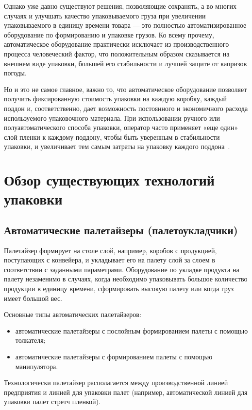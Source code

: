 Однако уже давно существуют решения, позволяющие сохранять, а во многих случаях и улучшать качество упаковываемого груза при увеличении упаковываемого в единицу времени товара --- это полностью автоматизированное оборудование по формированию и упаковке грузов. Ко всему прочему, автоматическое оборудование практически исключает из производственного процесса человеческий фактор, что положительным образом сказывается на внешнем виде упаковки, большей его стабильности и лучшей защите от капризов погоды. 

Но и это не самое главное, важно то, что автоматическое оборудование позволяет получить фиксированную стоимость упаковки на каждую коробку, каждый поддон и, соответственно, дает возможность постоянного и экономичного расхода используемого упаковочного материала. При использовании ручного или полуавтоматического способа упаковки, оператор часто применяет «еще один» слой пленки к каждому поддону, чтобы быть уверенным в стабильности упаковки, и увеличивает тем самым затраты на упаковку каждого поддона~\cite{stroi:upakovka}.

\section{Обзор существующих технологий упаковки}

\subsection*{Автоматические палетайзеры (палетоукладчики)}
Палетайзер формирует на столе слой, например, коробов с продукцией, поступающих с конвейера, и укладывает его на палету слой за слоем в соответствии с заданными параметрами. Оборудование по укладке продукта на палету незаменимо в случаях, когда необходимо упаковывать большое количество продукции в единицу времени, сформировать высокую палету или когда груз имеет большой вес.

Основные типы автоматических палетайзеров:

\begin{itemize}
    \item автоматические палетайзеры с послойным формированием палеты с помощью толкателя; 
    \item автоматические палетайзеры с формированием палеты с помощью манипулятора. 
\end{itemize}

Технологически палетайзер располагается между производственной линией предприятия и линией для упаковки палет (например, автоматической линией для упаковки палет стретч пленкой).

